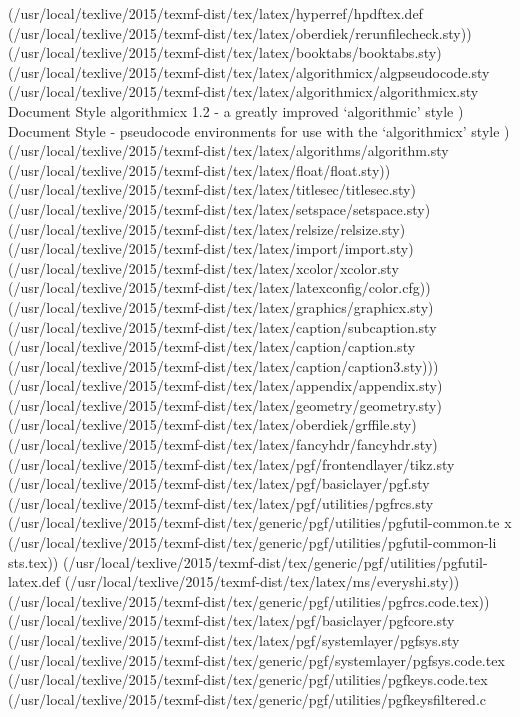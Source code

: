 (/usr/local/texlive/2015/texmf-dist/tex/latex/hyperref/hpdftex.def
(/usr/local/texlive/2015/texmf-dist/tex/latex/oberdiek/rerunfilecheck.sty))
(/usr/local/texlive/2015/texmf-dist/tex/latex/booktabs/booktabs.sty)
(/usr/local/texlive/2015/texmf-dist/tex/latex/algorithmicx/algpseudocode.sty
(/usr/local/texlive/2015/texmf-dist/tex/latex/algorithmicx/algorithmicx.sty
Document Style algorithmicx 1.2 - a greatly improved `algorithmic' style
)
Document Style - pseudocode environments for use with the `algorithmicx' style
) (/usr/local/texlive/2015/texmf-dist/tex/latex/algorithms/algorithm.sty
(/usr/local/texlive/2015/texmf-dist/tex/latex/float/float.sty))
(/usr/local/texlive/2015/texmf-dist/tex/latex/titlesec/titlesec.sty)
(/usr/local/texlive/2015/texmf-dist/tex/latex/setspace/setspace.sty)
(/usr/local/texlive/2015/texmf-dist/tex/latex/relsize/relsize.sty)
(/usr/local/texlive/2015/texmf-dist/tex/latex/import/import.sty)
(/usr/local/texlive/2015/texmf-dist/tex/latex/xcolor/xcolor.sty
(/usr/local/texlive/2015/texmf-dist/tex/latex/latexconfig/color.cfg))
(/usr/local/texlive/2015/texmf-dist/tex/latex/graphics/graphicx.sty)
(/usr/local/texlive/2015/texmf-dist/tex/latex/caption/subcaption.sty
(/usr/local/texlive/2015/texmf-dist/tex/latex/caption/caption.sty
(/usr/local/texlive/2015/texmf-dist/tex/latex/caption/caption3.sty)))
(/usr/local/texlive/2015/texmf-dist/tex/latex/appendix/appendix.sty)
(/usr/local/texlive/2015/texmf-dist/tex/latex/geometry/geometry.sty)
(/usr/local/texlive/2015/texmf-dist/tex/latex/oberdiek/grffile.sty)
(/usr/local/texlive/2015/texmf-dist/tex/latex/fancyhdr/fancyhdr.sty)
(/usr/local/texlive/2015/texmf-dist/tex/latex/pgf/frontendlayer/tikz.sty
(/usr/local/texlive/2015/texmf-dist/tex/latex/pgf/basiclayer/pgf.sty
(/usr/local/texlive/2015/texmf-dist/tex/latex/pgf/utilities/pgfrcs.sty
(/usr/local/texlive/2015/texmf-dist/tex/generic/pgf/utilities/pgfutil-common.te
x
(/usr/local/texlive/2015/texmf-dist/tex/generic/pgf/utilities/pgfutil-common-li
sts.tex))
(/usr/local/texlive/2015/texmf-dist/tex/generic/pgf/utilities/pgfutil-latex.def
(/usr/local/texlive/2015/texmf-dist/tex/latex/ms/everyshi.sty))
(/usr/local/texlive/2015/texmf-dist/tex/generic/pgf/utilities/pgfrcs.code.tex))
(/usr/local/texlive/2015/texmf-dist/tex/latex/pgf/basiclayer/pgfcore.sty
(/usr/local/texlive/2015/texmf-dist/tex/latex/pgf/systemlayer/pgfsys.sty
(/usr/local/texlive/2015/texmf-dist/tex/generic/pgf/systemlayer/pgfsys.code.tex
(/usr/local/texlive/2015/texmf-dist/tex/generic/pgf/utilities/pgfkeys.code.tex
(/usr/local/texlive/2015/texmf-dist/tex/generic/pgf/utilities/pgfkeysfiltered.c
